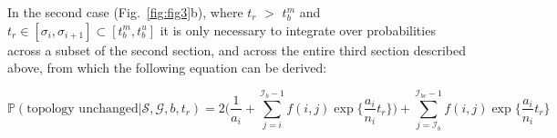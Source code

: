 \documentclass[11pt]{article}
\begin{document}



\noindent In the second case (Fig.~\ref{fig:fig3}b), where $t_r$ $>$ $t_b^m$ and 
$t_r \in [\sigma_i, \sigma_{i+1}] \subset [t_b^m,t_b^u]$ 
it is only necessary to integrate over probabilities across a subset of the 
second section, and across the entire third section described above, from 
which the following equation can be derived:


\begin{equation}
	\mathbb{P}(\textrm{topology unchanged} | \mathcal{S},\mathcal{G},b,t_r) = 
		2\bigg(
			\frac{1}{a_i} + \sum_{j=i}^{\mathcal{I}_{b}-1}f(i,j)\exp\bigg\{
				\frac{a_i}{n_i}t_r
			\bigg\}
		\bigg) + 
		\sum_{j=\mathcal{I}_b}^{\mathcal{I}_{bc}-1}f(i,j)\exp\bigg\{
			\frac{a_i}{n_i}t_r
		\bigg\}
\end{equation}
\end{document}
